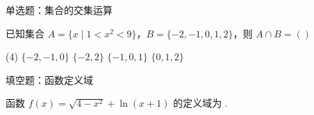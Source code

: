 \documentclass[11pt,a4paper]{article}
\begin{document}
\begin{mybox}{单选题：集合的交集运算}

已知集合 \( A = \{ x \mid 1 < x^2 < 9 \} \)，\( B = \{-2, -1, 0, 1, 2\} \)，则 \( A \cap B = ( ) \)

\begin{tasks}(4)
    \task \( \{-2, -1, 0\} \)
    \task \( \{-2, 2\} \)
    \task \( \{-1, 0, 1\} \)
    \task \( \{0, 1, 2\} \)
\end{tasks}

\end{mybox}

\vspace{2em}

\begin{mybox}{填空题：函数定义域}

函数 \( f(x) = \sqrt{4 - x^2} + \ln(x + 1) \) 的定义域为 \underline{\hspace{4cm}}.

\end{mybox}
\end{document}
